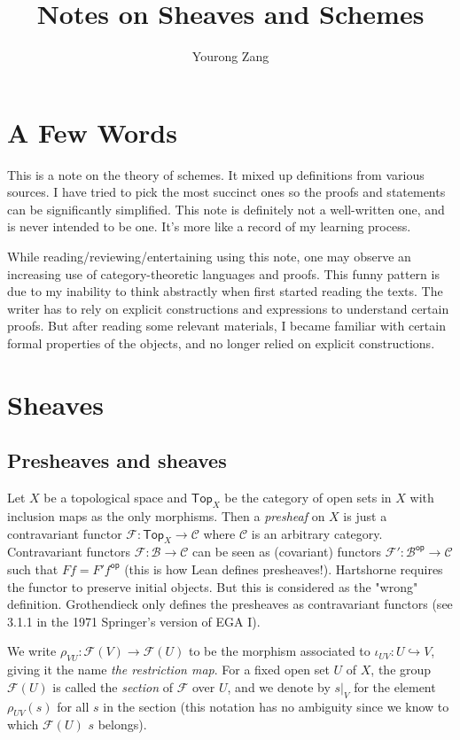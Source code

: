 \documentclass[12pt]{article}
\title{Notes on Sheaves and Schemes}
\author{Yourong Zang}
\theoremstyle{remark}
\newcommand{\Top}[0]{\mathsf{Top}}
\newcommand{\op}[0]{\mathsf{op}}
\begin{document}
    \maketitle
    \tableofcontents
    \newpage
	\section{A Few Words}\label{sec-foreword}
	This is a note on the theory of schemes. It mixed up definitions from various sources. I have tried to pick the most succinct ones so the proofs and statements can be significantly simplified. This note is definitely not a well-written one, and is never intended to be one. It's more like a record of my learning process.

	While reading/reviewing/entertaining using this note, one may observe an increasing use of category-theoretic languages and proofs. This funny pattern is due to my inability to think abstractly when first started reading the texts. The writer has to rely on explicit constructions and expressions to understand certain proofs. But after reading some relevant materials, I became familiar with certain formal properties of the objects, and no longer relied on explicit constructions.
	\section{Sheaves}\label{sec-sheaf}
    \subsection{Presheaves and sheaves}\label{ssec-sheaf}
    Let $X$ be a topological space and $\Top_X$ be the category of open sets in $X$ with inclusion maps as the only morphisms. Then a \textit{presheaf} on $X$ is just a contravariant functor $\mathscr F:\Top_X\to \mathcal C$ where $\mathcal C$ is an arbitrary category. Contravariant functors $\mathscr F:\mathcal B\to\mathcal C$ can be seen as (covariant) functors $\mathscr F':\mathcal B^\op\to \mathcal C$ such that $Ff=F'f^\op$ (this is how Lean defines presheaves!). Hartshorne requires the functor to preserve initial objects. But this is considered as the "wrong" definition. Grothendieck only defines the presheaves as contravariant functors (see 3.1.1 in the 1971 Springer's version of EGA I).
    
    We write $\rho_{VU}:\mathscr F(V)\to\mathscr F(U)$ to be the morphism associated to $\iota_{UV}: U\hookrightarrow V$, giving it the name \textit{the restriction map}. For a fixed open set $U$ of $X$, the group $\mathscr F(U)$ is called the \textit{section} of $\mathscr F$ over $U$, and we denote by $s|_V$ for the element $\rho_{UV}(s)$ for all $s$ in the section (this notation has no ambiguity since we know to which $\mathscr F(U)$ $s$ belongs).
    
\end{document}
